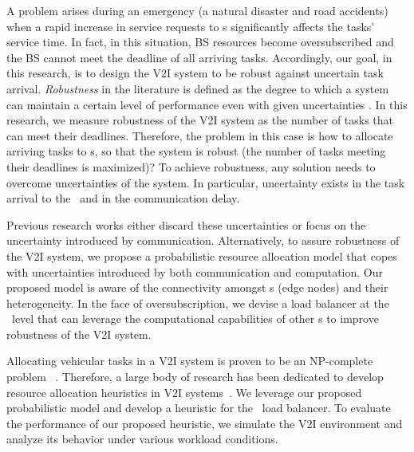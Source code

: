 A problem arises during an emergency (\eg a natural disaster and road accidents) when a rapid increase in service requests to \bs s significantly affects the tasks' service time. In fact, in this situation, BS resources become oversubscribed and the BS cannot meet the deadline of all arriving tasks. Accordingly, our goal, in this research, is to design the V2I system to be robust against uncertain task arrival. \emph{Robustness} in the literature is defined as the degree to which a system can maintain a certain level of performance even with given uncertainties \cite{ali2004measuring,smith2009robust,canon2010evaluation}. In this research, we measure robustness of the V2I system as the number of tasks that can meet their deadlines. Therefore, the problem in this case is how to allocate arriving tasks to \bs s, so that the system is robust (\ie the number of tasks meeting their deadlines is maximized)? To achieve robustness, any solution needs to overcome uncertainties of the system. In particular, uncertainty exists in the task arrival to the \bs~and in the communication delay. 

Previous research works either discard these uncertainties\cite{bok2016multiple} or focus on the uncertainty introduced by communication\cite{ali2011co}. Alternatively, to assure robustness of the V2I system, we propose a probabilistic resource allocation model that copes with uncertainties introduced by both communication and computation. Our proposed model is aware of the connectivity amongst \bs s (\ie edge nodes) and their heterogeneity. In the face of oversubscription, we devise a load balancer at the \bs~level that can leverage the computational capabilities of other \bs s to improve robustness of the V2I system. %

Allocating vehicular tasks in a V2I system is proven to be an NP-complete problem~\cite{Ullman1975} \cite{Lenstra1981}. Therefore, a large body of research has been dedicated to develop resource allocation heuristics in V2I systems~\cite{ali2004measuring,yu2016optimal,khemka2014utility,Lenstra1981,li2017resource,pyun2016,liu2010rsu}. We leverage our proposed probabilistic model and develop a heuristic for the \bs~load balancer. To evaluate the performance of our proposed heuristic, we simulate the V2I environment and analyze its behavior under various workload conditions.

